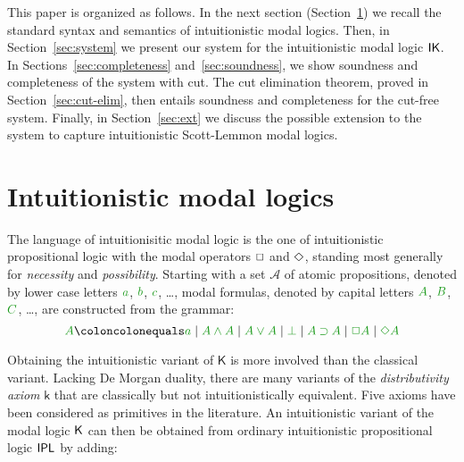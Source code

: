 \documentclass[a4paper]{article}
\begin{document}
 This paper is organized as follows. In the next section (Section~\ref{sec:intmod}) we recall the standard syntax and semantics of intuitionistic modal logics. Then, in Section~\ref{sec:system} we present our system for the intuitionistic modal logic $\mathsf{IK}$. In Sections~\ref{sec:completeness} and~\ref{sec:soundness}, we show soundness and completeness of the system with cut. The cut elimination theorem, proved in Section~\ref{sec:cut-elim}, then entails soundness and completeness for the cut-free system. Finally, in Section~\ref{sec:ext} we discuss the possible extension to the system to capture intuitionistic Scott-Lemmon modal logics.
 \section{Intuitionistic modal logics}\label{sec:intmod}
 
 
 
 The language of {intuitionisitic modal logic} is the one of intuitionistic propositional logic with the modal operators $\mathord{\Box}$ and $\mathord{\Diamond}$, standing most generally for \emph{necessity} and \emph{possibility}.
 Starting with a set $\mathcal{A}$ of atomic propositions, denoted by lower case letters $\fm a$, $\fm b$, $\fm c$, \ldots, modal formulas, denoted by capital letters $\fm A$, $\fm B$, $\fm C$, \ldots, are constructed from the grammar:
 $$
 \fm A \coloncolonequals
 \fm a \mid \fm{A \AND A} \mid \fm{A \OR A} \mid \fm \BOT \mid \fm{A \IMP A} \mid \fm{\BOX A} \mid \fm{\DIA A}
 $$
 
 Obtaining the intuitionistic variant of $\mathsf{K}$ is more involved than the classical variant. 
 Lacking De Morgan duality, there are many variants of the \emph{distributivity axiom} $\mathsf{k}$ that are classically but not intuitionistically equivalent. Five axioms have been considered as primitives in the literature. An intuitionistic variant of the modal logic $\mathsf{K}$ can then be obtained from ordinary intuitionistic propositional logic $\mathsf{IPL}$ by adding:
 
\end{document}
